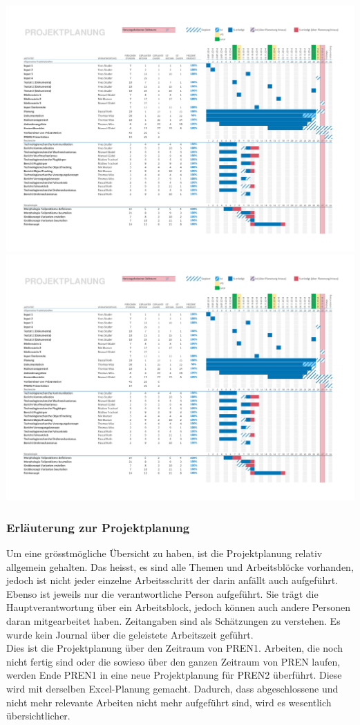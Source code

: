 \begin{landscape}
    \includegraphics[page=1,scale=0.8,clip,trim=15mm 22mm 13mm 18mm] {Enddokumentation/Projektplanung_Management/Bilder/Projekt-Planung_Team32.pdf}
    \newpage
    \includegraphics[page=2,scale=0.8,clip,trim=15mm 100mm 13mm 10mm] {Enddokumentation/Projektplanung_Management/Bilder/Projekt-Planung_Team32.pdf}
    \newpage
\end{landscape}
\subsubsection{Erläuterung zur Projektplanung}
Um eine grösstmögliche Übersicht zu haben, ist die Projektplanung relativ allgemein gehalten. 
Das heisst, es sind alle Themen und Arbeitsblöcke vorhanden, jedoch ist nicht jeder einzelne Arbeitsschritt der darin anfällt auch aufgeführt. 
Ebenso ist jeweils nur die verantwortliche Person aufgeführt. Sie trägt die Hauptverantwortung über ein Arbeitsblock, 
jedoch können auch andere Personen daran mitgearbeitet haben. Zeitangaben sind als Schätzungen zu verstehen. Es wurde kein Journal über die geleistete Arbeitszeit geführt.\\
Dies ist die Projektplanung über den Zeitraum von PREN1. Arbeiten, die noch nicht fertig sind oder 
die sowieso über den ganzen Zeitraum von PREN laufen, werden Ende PREN1 in eine neue Projektplanung für PREN2 überführt. 
Diese wird mit derselben Excel-Planung gemacht. Dadurch, dass abgeschlossene und nicht mehr relevante Arbeiten nicht mehr aufgeführt sind, wird es wesentlich übersichtlicher.  
